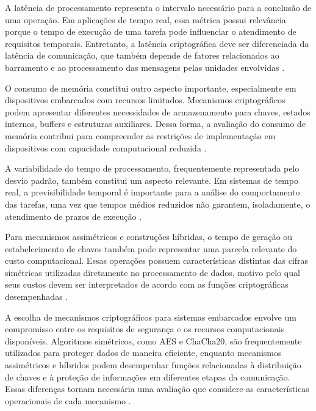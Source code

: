 A latência de processamento representa o intervalo necessário para a conclusão de uma operação. Em aplicações de tempo real, essa métrica possui relevância porque o tempo de execução de uma tarefa pode influenciar o atendimento de requisitos temporais. Entretanto, a latência criptográfica deve ser diferenciada da latência de comunicação, que também depende de fatores relacionados ao barramento e ao processamento das mensagens pelas unidades envolvidas \cite{davis2007controller,navet2017automotive}.

O consumo de memória constitui outro aspecto importante, especialmente em dispositivos embarcados com recursos limitados. Mecanismos criptográficos podem apresentar diferentes necessidades de armazenamento para chaves, estados internos, buffers e estruturas auxiliares. Dessa forma, a avaliação do consumo de memória contribui para compreender as restrições de implementação em dispositivos com capacidade computacional reduzida \cite{roman2011securing}.

A variabilidade do tempo de processamento, frequentemente representada pelo desvio padrão, também constitui um aspecto relevante. Em sistemas de tempo real, a previsibilidade temporal é importante para a análise do comportamento das tarefas, uma vez que tempos médios reduzidos não garantem, isoladamente, o atendimento de prazos de execução \cite{thiele2004design,reineke2006definition}.

Para mecanismos assimétricos e construções híbridas, o tempo de geração ou estabelecimento de chaves também pode representar uma parcela relevante do custo computacional. Essas operações possuem características distintas das cifras simétricas utilizadas diretamente no processamento de dados, motivo pelo qual seus custos devem ser interpretados de acordo com as funções criptográficas desempenhadas \cite{menezes2018handbook,yung2010applied}.

A escolha de mecanismos criptográficos para sistemas embarcados envolve um compromisso entre os requisitos de segurança e os recursos computacionais disponíveis. Algoritmos simétricos, como AES e ChaCha20, são frequentemente utilizados para proteger dados de maneira eficiente, enquanto mecanismos assimétricos e híbridos podem desempenhar funções relacionadas à distribuição de chaves e à proteção de informações em diferentes etapas da comunicação. Essas diferenças tornam necessária uma avaliação que considere as características operacionais de cada mecanismo \cite{menezes2018handbook,eisenbarth2007survey}.

